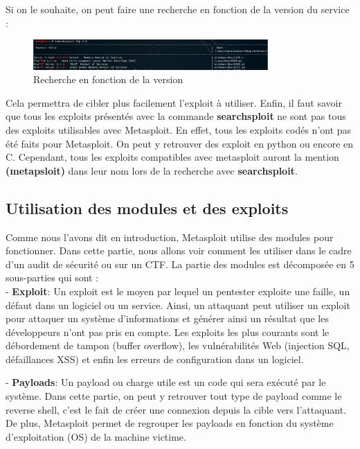 \noindent Si on le souhaite, on peut faire une recherche en fonction de la version du service :
\begin{figure}[htp!]
  \centering
  \setlength\figureheight{7cm}
  \setlength\figurewidth{9cm}
  \includegraphics[width=0.8\textwidth]{oui/Ancien/imangeancien/metasploit/searchsploit-ex2.PNG}
  \caption{Recherche en fonction de la version}
  \label{fig:courbe-tikz}
\end{figure}

    \noindent Cela permettra de cibler plus facilement l'exploit à utiliser. Enfin, il faut savoir que tous les exploits présentés avec la commande \textbf{searchsploit} ne sont pas tous des exploits utilisables avec Metasploit. En effet, tous les exploits codés n'ont pas été faits pour Metasploit. On peut y retrouver des exploit en python ou encore en C. Cependant, tous les exploits compatibles avec metasploit auront la mention \textbf{(metapsloit)} dans leur nom lors de la recherche avec \textbf{searchsploit}. 

\subsection{Utilisation des modules et des exploits}

Comme nous l'avons dit en introduction, Metasploit utilise des modules pour fonctionner. Dans cette partie, nous allons voir comment les utiliser dans le cadre d'un audit de sécurité ou sur un CTF. La partie des modules est décomposée en 5 sous-parties qui sont :\\

- \textbf{Exploit}: Un exploit est le moyen par lequel un pentester exploite une faille, un défaut dans un logiciel ou un service. Ainsi, un attaquant peut utiliser un exploit pour attaquer un système d'informations et générer ainsi un résultat que les développeurs n'ont pas pris en compte. Les exploits les plus courants sont le débordement de tampon (buffer overflow), les vulnérabilités Web (injection SQL, défaillances XSS) et enfin les erreurs de configuration dans un logiciel.

- \textbf{Payloads}: Un payload ou charge utile est un code qui sera exécuté par le système. Dans cette partie, on peut y retrouver tout type de payload comme le reverse shell, c'est le fait de créer une connexion depuis la cible vers l’attaquant. De plus, Metasploit permet de regrouper les payloads en fonction du système d'exploitation (OS) de la machine victime.

